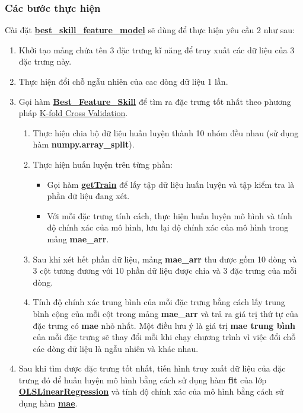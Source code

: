 \documentclass{report}
\begin{document}
    \subsubsection{Các bước thực hiện}
    Cài đặt \hyperref[sec:bestskillfeaturemodel]{\textbf{best\_skill\_feature\_model}} sẽ dùng để thực hiện yêu cầu 2 như sau:
        \begin{enumerate}
            \item Khởi tạo mảng chứa tên 3 đặc trưng kĩ năng để truy xuất các dữ liệu của 3 đặc trưng này.
            \item Thực hiện đổi chỗ ngẫu nhiên của cac dòng dữ liệu 1 lần.
            \item Gọi hàm \hyperref[sec:BestFeatureSkill]{\textbf{Best\_Feature\_Skill}}  để tìm ra đặc trưng tốt nhất theo phương pháp \hyperref[sec:k-fold-cross-validation]{K-fold Cross Validation}.
            \begin{enumerate}
                \item Thực hiện chia bộ dữ liệu huấn luyện thành 10 nhóm đều nhau (sử dụng hàm \textbf{numpy.array\_split}).
                \item Thực hiện huấn luyện trên từng phần:
                    \begin{itemize}
                        \item Gọi hàm \hyperref[sec:getTrain]{\textbf{getTrain}} để lấy tập dữ liệu huấn luyện và tập kiểm tra là phần dữ liệu đang xét.
                        \item Với mỗi đặc trưng tính cách, thực hiện huấn luyện mô hình và tính độ chính xác của mô hình, lưu lại độ chính xác của mô hình trong mảng \textbf{mae\_arr}.
                    \end{itemize}
                \item Sau khi xét hết phần dữ liệu, mảng \textbf{mae\_arr} thu được gồm 10 dòng và 3 cột tương đương với 10 phần dữ liệu được chia và 3 đặc trưng của mỗi dòng.
                \item Tính độ chính xác trung bình của mỗi đặc trưng bằng cách lấy trung bình cộng của mỗi cột trong mảng \textbf{mae\_arr} và trả ra giá trị thứ tự của đặc trưng có \textbf{mae} nhỏ nhất. Một điều lưu ý là giá trị \textbf{mae trung bình} của mỗi đặc trưng sẽ thay đổi mỗi khi chạy chương trình vì việc đổi chỗ các dòng dữ liệu là ngẫu nhiên và khác nhau. 
            \end{enumerate}
            \item Sau khi tìm được đặc trưng tốt nhất, tiến hình truy xuất dữ liệu của đặc trưng đó để huấn luyện mô hình bằng cách sử dụng hàm \textbf{fit} của lớp \hyperref[sec:olslinearregression]{\textbf{OLSLinearRegression}}  và tính độ chính xác của mô hình bằng cách sử dụng hàm \hyperref[sec:mae]{\textbf{mae}}.
        \end{enumerate}
\end{document}

